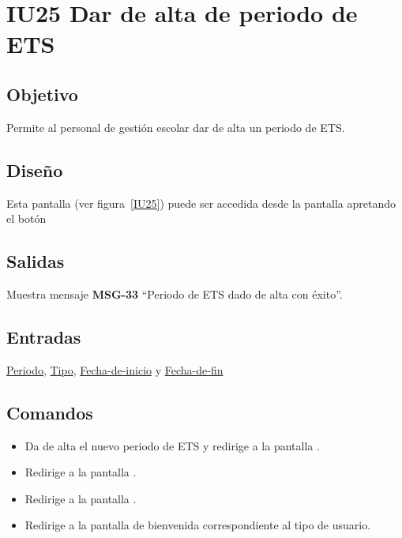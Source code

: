 
\section{IU25 Dar de alta de periodo de ETS}
\subsection{Objetivo}
    Permite al personal de gestión escolar dar de alta un periodo de ETS.
\subsection{Diseño}
    Esta pantalla  (ver figura~\ref{IU25}) puede ser accedida desde la pantalla  apretando el botón 

\subsection{Salidas}
Muestra mensaje {\bf MSG-33} ``Periodo de ETS  dado de alta con éxito''.
\subsection{Entradas}
\hyperlink{Periodo de ETS.Periodo}{Periodo}, \hyperlink{Periodo-de-ETS.Tipo}{Tipo}, \hyperlink{Periodo-de-ETS.Fecha-de-inicio}{Fecha-de-inicio} y \hyperlink{Periodo-de-ETS.Fecha-de-fin}{Fecha-de-fin}
\subsection{Comandos}
\begin{itemize}
    \item {} Da de alta el nuevo periodo de ETS y redirige a la pantalla .
    \item {} Redirige a la pantalla .
    \item {} Redirige a la pantalla .
    \item {} Redirige a la pantalla de bienvenida correspondiente al tipo de usuario.
    
\end{itemize}

